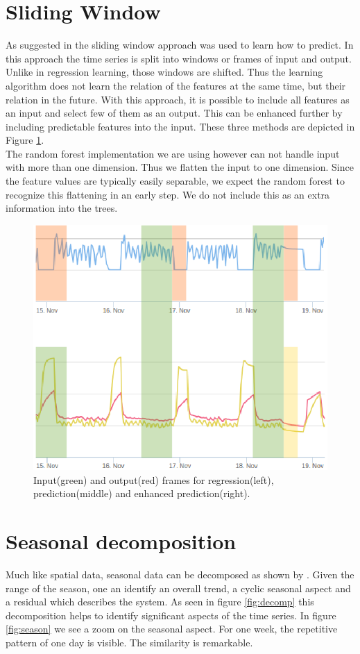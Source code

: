 \documentclass{scrartcl}
\begin{document}
\section{Sliding Window}
\label{sec:slidingwindow}
As suggested in \cite{vafaeipour2014application} the sliding window approach was used to learn how to predict. In this approach the time series is split into windows or frames of input and output. Unlike in regression learning, those windows are shifted. Thus the learning algorithm does not learn the relation of the features at the same time, but their relation in the future. With this approach, it is possible to include all features as an input and select few of them as an output. This can be enhanced further by including predictable features into the input. These three methods are depicted in Figure \ref{fig:slidingwindow}.\\
The random forest implementation we are using however can not handle input with more than one dimension. Thus we flatten the input to one dimension. Since the feature values are typically easily separable, we expect the random forest to recognize this flattening in an early step. We do not include this as an extra information into the trees.

\begin{figure}[H]
  \centering
    \includegraphics[width=0.5\linewidth]{img/regpred.png}
  \caption{Input(green) and output(red) frames for regression(left), prediction(middle) and enhanced prediction(right).}
  \label{fig:slidingwindow}
\end{figure}

\section{Seasonal decomposition}
\label{sec:season}
Much like spatial data, seasonal data can be decomposed as shown by \cite{loess}. Given the range of the season, one an identify an overall trend, a cyclic seasonal aspect and a residual which describes the system. As seen in figure \ref{fig:decomp} this decomposition helps to identify significant aspects of the time series. In figure \ref{fig:season} we see a zoom on the seasonal aspect. For one week, the repetitive pattern of one day is visible. The similarity is remarkable.
\end{document}
